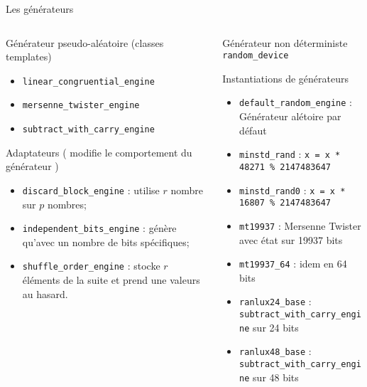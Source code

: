 \documentclass[handout,10pt]{beamer}
\begin{document}
\begin{frame}[fragile]{Les générateurs}
\tiny
\begin{columns}
 \begin{column}{0.5\textwidth}
  \begin{block}{Générateur pseudo-aléatoire (classes templates)}
  \begin{itemize}
  \item \lstinline$linear_congruential_engine$ 
  \item \lstinline$mersenne_twister_engine$ 
  \item \lstinline$subtract_with_carry_engine$
  \end{itemize}
 \end{block}
 \begin{block}{Adaptateurs ( modifie le comportement du générateur )}
  \begin{itemize}
   \item \lstinline$discard_block_engine$ : utilise $r$ nombre sur $p$ nombres;
   \item \lstinline$independent_bits_engine$ : génère qu'avec un nombre de bits spécifiques;
   \item \lstinline$shuffle_order_engine$ : stocke $r$ éléments de la suite et prend une valeurs au hasard.
  \end{itemize}
 \end{block}
 \end{column}
 \begin{column}{0.5\textwidth}
 \begin{block}{Générateur non déterministe}
 \lstinline$random_device$
 \end{block}
 \begin{block}{Instantiations de générateurs}
 \begin{itemize}
  \item \lstinline$default_random_engine$ : Générateur alétoire par défaut
  \item \lstinline$minstd_rand$ : \lstinline$x = x * 48271 % 2147483647$	
  \item \lstinline$minstd_rand0$ : \lstinline$x = x * 16807 % 2147483647$
  \item \lstinline$mt19937$ : Mersenne Twister avec état sur 19937 bits
  \item \lstinline$mt19937_64$ : idem en 64 bits
  \item \lstinline$ranlux24_base$ : \lstinline$subtract_with_carry_engine$ sur 24 bits
  \item \lstinline$ranlux48_base$ : \lstinline$subtract_with_carry_engine$ sur 48 bits

\end{itemize}
\end{block}
\end{column}
\end{columns}
\end{frame}
\end{document}
